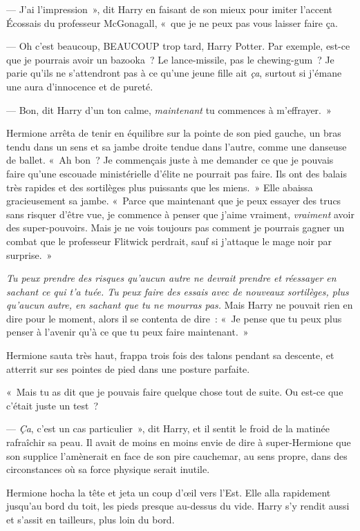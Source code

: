 --- J'ai l'impression~», dit Harry en faisant de son mieux pour imiter l'accent Écossais du professeur McGonagall, «~que je ne peux pas vous laisser faire ça.

--- Oh c'est beaucoup, BEAUCOUP trop tard, Harry Potter. Par exemple, est-ce que je pourrais avoir un bazooka~? Le lance-missile, pas le chewing-gum~? Je parie qu'ils ne s'attendront pas à ce qu'une jeune fille ait \emph{ça}, surtout si j'émane une aura d'innocence et de pureté.

--- Bon, dit Harry d'un ton calme, \emph{maintenant} tu commences à m'effrayer.~»

Hermione arrêta de tenir en équilibre sur la pointe de son pied gauche, un bras tendu dans un sens et sa jambe droite tendue dans l'autre, comme une danseuse de ballet. «~Ah bon~? Je commençais juste à me demander ce que je pouvais faire qu'une escouade ministérielle d'élite ne pourrait pas faire. Ils ont des balais très rapides et des sortilèges plus puissants que les miens.~» Elle abaissa gracieusement sa jambe. «~Parce que maintenant que je peux essayer des trucs sans risquer d'être vue, je commence à penser que j'aime vraiment, \emph{vraiment} avoir des super-pouvoirs. Mais je ne vois toujours pas comment je pourrais gagner un combat que le professeur Flitwick perdrait, sauf si j'attaque le mage noir par surprise.~»

\emph{Tu peux prendre des risques qu'aucun autre ne devrait prendre et réessayer en sachant ce qui t'a tuée. Tu peux faire des essais avec de nouveaux sortilèges, plus qu'aucun autre, en sachant que tu ne mourras pas.} Mais Harry ne pouvait rien en dire pour le moment, alors il se contenta de dire~: «~Je pense que tu peux plus penser à l'avenir qu'à ce que tu peux faire maintenant.~»

Hermione sauta très haut, frappa trois fois des talons pendant sa descente, et atterrit sur ses pointes de pied dans une posture parfaite.

«~Mais tu as dit que je pouvais faire quelque chose tout de suite. Ou est-ce que c'était juste un test~?

--- \emph{Ça}, c'est un cas particulier~», dit Harry, et il sentit le froid de la matinée rafraîchir sa peau. Il avait de moins en moins envie de dire à super-Hermione que son supplice l'amènerait en face de son pire cauchemar, au sens propre, dans des circonstances où sa force physique serait inutile.

Hermione hocha la tête et jeta un coup d'œil vers l'Est. Elle alla rapidement jusqu'au bord du toit, les pieds presque au-dessus du vide. Harry s'y rendit aussi et s'assit en tailleurs, plus loin du bord.

